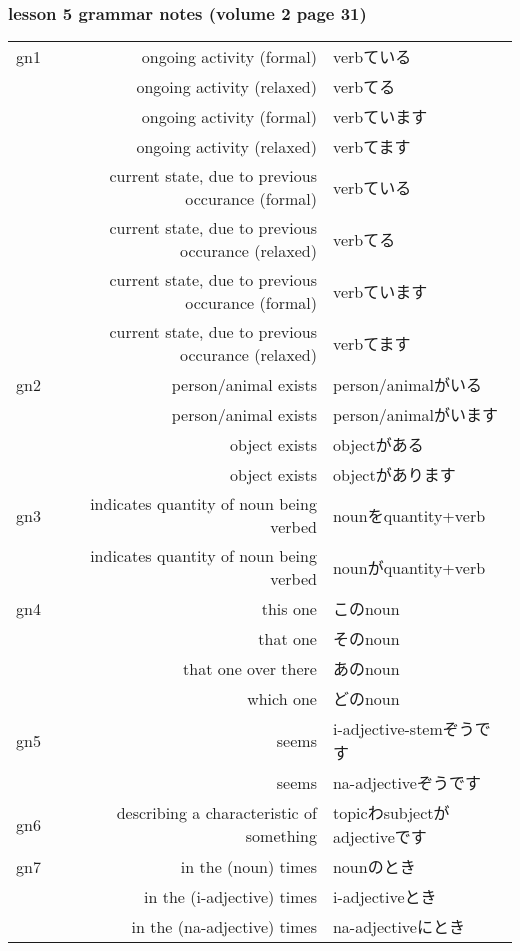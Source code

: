 \documentclass[14pt,onecolumn]{extarticle}
\begin{document}
\begin{CJK}{UTF8}{min}

\subsubsection{lesson 5 grammar notes (volume 2 page 31)}
\begin{tabular}{lrl}

gn1
&ongoing activity (formal)&verbている\\
&ongoing activity (relaxed)&verbてる\\
&ongoing activity (formal)&verbています\\
&ongoing activity (relaxed)&verbてます\\
&current state, due to previous occurance (formal)&verbている\\
&current state, due to previous occurance (relaxed)&verbてる\\
&current state, due to previous occurance (formal)&verbています\\
&current state, due to previous occurance (relaxed)&verbてます\\
\hline

gn2
&person/animal exists&person/animalがいる\\
&person/animal exists&person/animalがいます\\
&object exists&objectがある\\
&object exists&objectがあります\\
\hline

gn3
&indicates quantity of noun being verbed&nounをquantity+verb\\
&indicates quantity of noun being verbed&nounがquantity+verb\\
\hline

gn4
&this one&このnoun\\
&that one&そのnoun\\
&that one over there&あのnoun\\
&which one&どのnoun\\
\hline

gn5
&seems&i-adjective-stemぞうです\\
&seems&na-adjectiveぞうです\\
\hline

gn6
&describing a characteristic of something&topicわsubjectがadjectiveです\\
\hline

gn7
&in the (noun) times&nounのとき\\
&in the (i-adjective) times&i-adjectiveとき\\
&in the (na-adjective) times&na-adjectiveにとき\\
\hline


\end{tabular}
\end{CJK}
\end{document}
